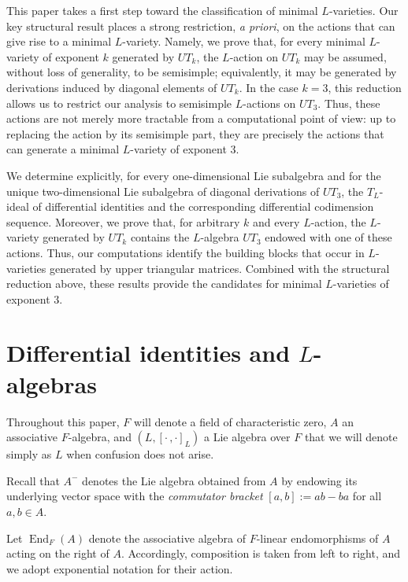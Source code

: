 \documentclass[a4paper,reqno]{amsart}
\theoremstyle{definition}
\numberwithin{equation}{section}
\numberwithin{theorem}{section}
\DeclareMathOperator{\E}{End}
\begin{document}
This paper takes a first step toward the classification of minimal $L$-varieties. Our key structural result places a strong restriction, \emph{a priori}, on the actions that can give rise to a minimal $L$-variety. Namely, we prove that, for every minimal $L$-variety of exponent $k$ generated by $UT_k$, the $L$-action on $UT_k$ may be assumed, without loss of generality, to be semisimple; equivalently, it may be generated by derivations induced by diagonal elements of $UT_k$.
In the case $k=3$, this reduction allows us to restrict our analysis to semisimple $L$-actions on $UT_3$. Thus, these actions are not merely more tractable from a computational point of view: up to replacing the action by its semisimple part, they are precisely the actions that can generate a minimal $L$-variety of exponent $3$.

We determine explicitly, for every one-dimensional Lie subalgebra and for the unique two-dimensional Lie subalgebra of diagonal derivations of $UT_3$, the $T_L$-ideal of differential identities and the corresponding differential codimension sequence. Moreover, we prove that, for arbitrary $k$ and every $L$-action, the $L$-variety generated by $UT_k$ contains the $L$-algebra $UT_3$ endowed with one of these actions. Thus, our computations identify the building blocks that occur in $L$-varieties generated by upper triangular matrices. Combined with the structural reduction above, these results provide the candidates for minimal $L$-varieties of exponent $3$.










\section{Differential identities and $L$-algebras}
Throughout this paper, $F$ will denote a field of characteristic zero, $A$ an associative $F$-algebra, and $(L,[\cdot\, ,\cdot]_L)$ a Lie algebra over $F$ that we will denote simply as $L$ when confusion does not arise.

Recall that $A^-$ denotes the Lie algebra obtained from $A$ by endowing its underlying vector space with the \emph{commutator bracket} $[a,b]:=ab-ba$ for all $a,b\in A$.



Let $\E_F(A)$ denote the associative algebra of $F$-linear endomorphisms of $A$ acting on the right of $A$. Accordingly, composition is taken from left to right, and we adopt exponential notation for their action.
\end{document}
